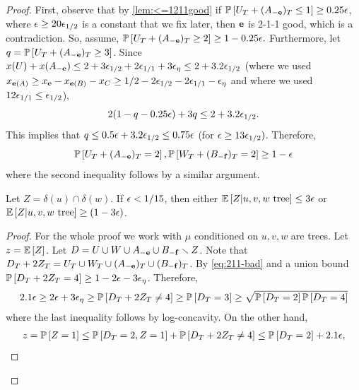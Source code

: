 \begin{proof}
%	
	First, observe that by \cref{lem:<=1211good} if ${\mathbb{P}}\left[U_T+(A_{-{\bf e}})_T\leq 1\right]\geq 0.25{\epsilon}$, where ${\epsilon}\geq 20{\epsilon}_{1/2}$ is a constant that we fix later, then ${\bf e}$ is 2-1-1 good, which is a contradiction. 
	So, assume, ${\mathbb{P}}\left[U_T+(A_{-{\bf e}})_T\geq 2\right]\geq 1-0.25{\epsilon}.$
	Furthermore, let $q={\mathbb{P}}\left[U_T+(A_{-{\bf e}})_T\geq 3\right]$. Since $x(U)+x(A_{-{\bf e}})\leq 2+3{\epsilon}_{1/2}+2{\epsilon}_{1/1}+3{\epsilon}_\eta\leq 2+3.2{\epsilon}_{1/2}$ (where we used $x_{{\bf e}(A)}\geq x_{\bf e} - x_{{\bf e}(B)} - x_C\geq  1/2-2{\epsilon}_{1/2}-2{\epsilon}_{1/1}-{\epsilon}_{\eta}$ and where we used $12{\epsilon}_{1/1}\leq {\epsilon}_{1/2}$), 
	$$ 2(1-q-0.25{\epsilon}) +3q \leq 2+3.2{\epsilon}_{1/2}.$$
	This implies that $q\leq 0.5{\epsilon} + 3.2{\epsilon}_{1/2}\leq 0.75{\epsilon}$ (for ${\epsilon}\geq  13{\epsilon}_{1/2})$.
	Therefore, 
	\begin{equation}\label{eq:211-bad}
		{\mathbb{P}}\left[U_T+(A_{-{\bf e}})_T=2\right],{\mathbb{P}}\left[W_T+(B_{-{\bf f}})_T=2\right]\geq 1-{\epsilon}
	\end{equation}
	where the second inequality follows by a similar argument.
	\begin{claim} 	Let $Z=\delta(u)\cap\delta(w)$. If ${\epsilon}<1/15$, then either
		${\mathbb{E}}\left[Z | u,v,w\text{ tree}\right]\leq 3{\epsilon}$ or ${\mathbb{E}}\left[Z | u,v,w\text{ tree}\right]\geq (1-3{\epsilon})$.
	\end{claim}
\begin{proof}
For the whole proof we work with $\mu$ conditioned on $u,v,w$ are trees.
	Let $z={\mathbb{E}}\left[Z\right]$.
	Let $D=U\cup W\cup A_{-{\bf e}}\cup B_{-{\bf f}}\smallsetminus Z$. Note that $D_T+2Z_T=U_T\cup W_T\cup (A_{-{\bf e}})_T\cup (B_{-{\bf f}})_T$.
	By \cref{eq:211-bad} and a union bound ${\mathbb{P}}\left[D_T+2Z_T=4\right]\geq 1-2{\epsilon}-3{\epsilon}_\eta$. Therefore,
	\begin{align*}
		2.1{\epsilon}\geq 2{\epsilon}+3{\epsilon}_\eta  \geq {\mathbb{P}}\left[D_T+2Z_T\neq 4\right] \geq {\mathbb{P}}\left[D_T=3\right] \geq \sqrt{{\mathbb{P}}\left[D_T=2\right]{\mathbb{P}}\left[D_T=4\right]}
	\end{align*}
	where the last inequality follows by log-concavity.
	On the other hand,  
	\begin{align*} &z=\P{Z=1} \leq \P{D_T=2,Z=1}+\P{D_T+2Z_T\neq 4} \leq \P{D_T=2} + 2.1\eps,\\	

\end{align*}
\end{proof}
\end{proof}
